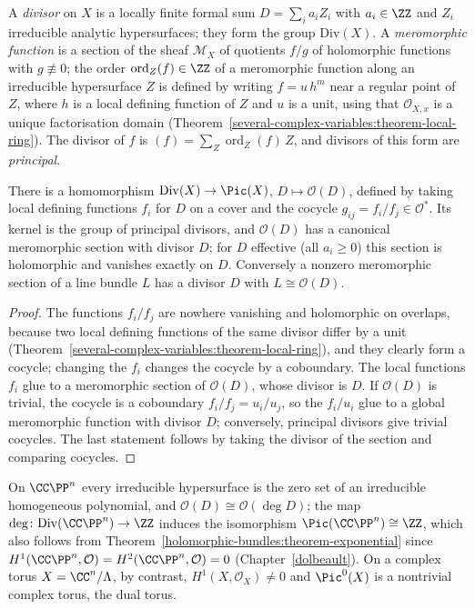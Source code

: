 \begin{definition}\label{holomorphic-bundles:definition-divisor}
A \emph{divisor} on $X$ is a locally finite formal sum $D = \sum_ia_iZ_i$ with $a_i \in \ZZ$ and $Z_i$ irreducible analytic hypersurfaces; they form the group $\mathrm{Div}(X)$. A \emph{meromorphic function}
is a section of the sheaf $\mathcal{M}_X$ of quotients $f/g$ of holomorphic functions with $g \not\equiv 0$; the order $\operatorname{ord}_Z(f) \in \ZZ$ of a meromorphic function along an irreducible
hypersurface $Z$ is defined by writing $f = u\,h^m$ near a regular point of $Z$, where $h$ is a local defining function of $Z$ and $u$ is a unit, using that $\mathcal{O}_{X,x}$ is a unique factorisation domain
(Theorem~\ref{several-complex-variables:theorem-local-ring}). The divisor of $f$ is $(f) = \sum_Z\operatorname{ord}_Z(f)\,Z$, and divisors of this form are \emph{principal}.
\end{definition}

\begin{proposition}\label{holomorphic-bundles:proposition-divisor-line-bundle}
There is a homomorphism $\mathrm{Div}(X) \to \Pic(X)$, $D \mapsto \mathcal{O}(D)$, defined by taking local defining functions $f_i$ for $D$ on a cover and the cocycle $g_{ij} = f_i/f_j \in \mathcal{O}^*$. Its kernel
is the group of principal divisors, and $\mathcal{O}(D)$ has a canonical meromorphic section with divisor $D$; for $D$ effective (all $a_i \geq 0$) this section is holomorphic and vanishes exactly on $D$.
Conversely a nonzero meromorphic section of a line bundle $L$ has a divisor $D$ with $L \cong \mathcal{O}(D)$.
\end{proposition}

\begin{proof}
The functions $f_i/f_j$ are nowhere vanishing and holomorphic on overlaps, because two local defining functions of the same divisor differ by a unit
(Theorem~\ref{several-complex-variables:theorem-local-ring}), and they clearly form a cocycle; changing the $f_i$ changes the cocycle by a coboundary. The local functions $f_i$ glue to a meromorphic section
of $\mathcal{O}(D)$, whose divisor is $D$. If $\mathcal{O}(D)$ is trivial, the cocycle is a coboundary $f_i/f_j = u_i/u_j$, so the $f_i/u_i$ glue to a global meromorphic function with divisor $D$; conversely,
principal divisors give trivial cocycles. The last statement follows by taking the divisor of the section and comparing cocycles.
\end{proof}

\begin{example}\label{holomorphic-bundles:example-divisors-projective}
On $\CC\PP^n$ every irreducible hypersurface is the zero set of an irreducible homogeneous polynomial, and $\mathcal{O}(D) \cong \mathcal{O}(\deg D)$; the map $\deg \colon \mathrm{Div}(\CC\PP^n) \to \ZZ$
induces the isomorphism $\Pic(\CC\PP^n) \cong \ZZ$, which also follows from Theorem~\ref{holomorphic-bundles:theorem-exponential} since $H^1(\CC\PP^n, \mathcal{O}) = H^2(\CC\PP^n, \mathcal{O}) = 0$
(Chapter~\ref{dolbeault}). On a complex torus $X = \CC^n/\Lambda$, by contrast, $H^1(X, \mathcal{O}_X) \neq 0$ and $\Pic^0(X)$ is a nontrivial complex torus, the dual torus.
\end{example}

